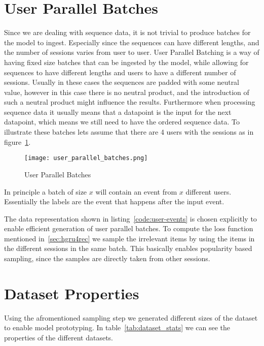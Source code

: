 \section{User Parallel Batches}
Since we are dealing with sequence data, it is not trivial to produce batches for the model to ingest.
Especially since the sequences can have different lengths, and the number of sessions varies from user to user.
User Parallel Batching is a way of having fixed size batches that can be ingested by the model, while allowing for sequences to have different lengths and users to have a different number of sessions.
Usually in these cases the sequences are padded with some neutral value, however in this case there is no neutral product, and the introduction of such a neutral product might influence the results.
Furthermore when processing sequence data it usually means that a datapoint is the input for the next datapoint, which means we still need to have the ordered sequence data.
To illustrate these batches lets assume that there are 4 users with the sessions as in figure~\ref{fig:user_parallel_batches}.

\begin{figure}[ht]
	\centering
	\captionsetup{width=0.8\textwidth}
    \texttt{[image: user\_parallel\_batches.png]}
    \caption{User Parallel Batches}
    \label{fig:user_parallel_batches}
\end{figure}

In principle a batch of size $x$ will contain an event from $x$ different users.
Essentially the labels are the event that happens after the input event.
\par
The data representation shown in listing~\ref{code:user-events} is chosen explicitly to enable efficient generation of user parallel batches.
To compute the loss function mentioned in~\ref{sec:hgru4rec} we sample the irrelevant items by using the items in the different sessions in the same batch.
This basically enables popularity based sampling, since the samples are directly taken from other sessions.

\section{Dataset Properties}\label{sec:dataset_properties}
Using the afromentioned sampling step we generated different sizes of the dataset to enable model prototyping.
In table~\ref{tab:dataset_stats} we can see the properties of the different datasets.

